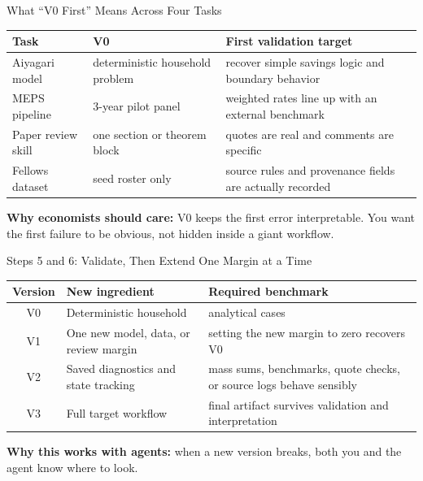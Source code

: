 \documentclass[10pt,english,aspectratio=169]{beamer}
\begin{document}
\begin{frame}{What ``V0 First'' Means Across Four Tasks}
\begin{center}
\small
\begin{tabular}{|p{2.2cm}|p{3.3cm}|p{5.2cm}|}
\hline
\textbf{Task} & \textbf{V0} & \textbf{First validation target} \\ \hline
Aiyagari model & deterministic household problem & recover simple savings logic and boundary behavior \\ \hline
MEPS pipeline & 3-year pilot panel & weighted rates line up with an external benchmark \\ \hline
Paper review skill & one section or theorem block & quotes are real and comments are specific \\ \hline
Fellows dataset & seed roster only & source rules and provenance fields are actually recorded \\ \hline
\end{tabular}
\end{center}

\vspace{0.25cm}
\textbf{Why economists should care:} V0 keeps the first error interpretable. You want the first failure to be obvious, not hidden inside a giant workflow.
\end{frame}

\begin{frame}{Steps 5 and 6: Validate, Then Extend One Margin at a Time}
\begin{center}
\small
\begin{tabular}{|c|p{3.5cm}|p{4.0cm}|}
\hline
\textbf{Version} & \textbf{New ingredient} & \textbf{Required benchmark} \\ \hline
V0 & Deterministic household & analytical cases \\ \hline
V1 & One new model, data, or review margin & setting the new margin to zero recovers V0 \\ \hline
V2 & Saved diagnostics and state tracking & mass sums, benchmarks, quote checks, or source logs behave sensibly \\ \hline
V3 & Full target workflow & final artifact survives validation and interpretation \\ \hline
\end{tabular}
\end{center}

\vspace{0.25cm}

\textbf{Why this works with agents:} when a new version breaks, both you and the agent know where to look.
\end{frame}
\end{document}
